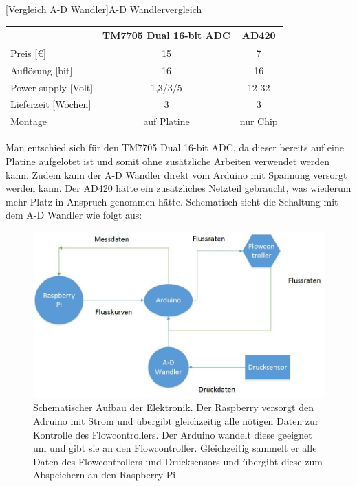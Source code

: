 \begin{center}
	[Vergleich A-D Wandler]{A-D Wandlervergleich}
	\vspace{0.25cm}
\begin{tabular}{l|c|c}
	& TM7705 Dual 16-bit ADC & AD420 \\ 
	\hline Preis [\euro]	& 15  & 7 \\ 
	\hline Auflösung [bit]	& 16  & 16 \\ 
	\hline Power supply [Volt]	& 1,3/3/5  & 12-32 \\ 
	\hline Lieferzeit [Wochen]	& 3  & 3 \\ 
	\hline Montage 	& auf Platine  & nur Chip \\ 
\end{tabular} 	
\end{center}


Man entschied sich für den TM7705 Dual 16-bit ADC, da dieser bereits auf eine Platine aufgelötet ist und somit ohne zusätzliche Arbeiten verwendet werden kann. Zudem kann der A-D Wandler direkt vom Arduino mit Spannung versorgt werden kann. Der AD420 hätte ein zusätzliches Netzteil gebraucht, was wiederum mehr Platz in Anspruch genommen hätte. Schematisch sieht die Schaltung mit dem A-D Wandler wie folgt aus:


\begin{figure}[h!]
	\begin{center}
		\includegraphics[scale=0.6]{Schema_Elektronik.jpg}
		\caption[Schema Elektronik]{Schematischer Aufbau der Elektronik. Der Raspberry versorgt den Adruino mit Strom und übergibt gleichzeitig alle nötigen Daten zur Kontrolle des Flowcontrollers. Der Arduino wandelt diese geeignet um und gibt sie an den Flowcontroller. Gleichzeitig sammelt er alle Daten des Flowcontrollers und Drucksensors und übergibt diese zum Abspeichern an den Raspberry Pi}
	\end{center}
\end{figure}


